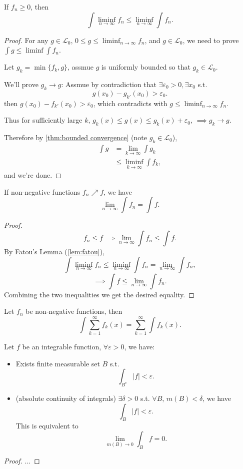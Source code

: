 \begin{lemma}
	\label{lem:fatou}
	If $f_n\ge 0$, then
	\[
		\int \liminf_{n\to \infty}f_n\le \liminf_{n\to \infty}\int f_n
	.\]
\end{lemma}
\begin{proof}[Proof]
	For any $g\in \mathcal{L}_0$,
	$0\le g\le \liminf_{n\to \infty} f_n$, and $g\in \mathcal{L}_0$,
	we need to prove $\int g\le \liminf \int f_n$. 

	Let $g_k=\min\{f_k, g\}$, assmue $g$ is uniformly bounded
	so that $g_k\in \mathcal{L}_0$.
	
    We'll prove $g_k\to g$:
	Assmue by contradiction that $\exists\varepsilon_0>0, \exists x_0$ s.t.
	\[
		g(x_0) - g_{k'}(x_0) > \varepsilon_0
	.\]
	then $g(x_0) - f_{k'}(x_0) > \varepsilon_0$,
	which contradicts with $g\le \liminf_{n\to \infty} f_n$.
	
	Thus for sufficiently large $k$,
	$g_k(x)\le g(x)\le g_k(x) + \varepsilon_0$, $\implies g_k\to g$.
	
	Therefore by \autoref{thm:bounded convergence} (note $g_k\in \mathcal{L}_0$),
	\begin{align*}
		\int g &= \lim_{k \to \infty}\int g_k \\
		&\le \liminf_{k \to \infty} \int f_k,
	\end{align*}
	and we're done.
\end{proof}

\begin{theorem}
	\label{thm:beppo-levi}
    If non-negative functions $f_n \nearrow f$, we have
	 \[
	\lim_{n\to \infty}\int f_n = \int f
	.\]
\end{theorem}
\begin{proof}[Proof]
    \[
    f_n\le f\implies \lim_{n \to \infty}\int f_n \le \int f
    .\]
    By Fatou's Lemma (\ref{lem:fatou}),
	\[
	\int \liminf_{n\to \infty} f_n \le \liminf_{n\to \infty}\int f_n
	= \lim_{n \to \infty}\int f_n,
	\]
	\[
		\implies \int f \le \lim_{n\to \infty} \int f_n.
	\]
	Combining the two inequalities we get the desired equality.
\end{proof}
\begin{corollary}
    Let $f_n$ be non-negative functions, then
	\[
	\int \sum_{k=1}^{\infty} f_k(x) = \sum_{k=1}^{\infty} \int f_k(x)
	.\]
\end{corollary}

\begin{proposition}
    Let $f$ be an integrable function, $\forall\varepsilon>0$, we have:
	 \begin{itemize}
		\item Exists finite measurable set $B$ s.t.
			\[
				\int_{B^c}|f|<\varepsilon
			.\]
	    \item (absolute continuity of integrals) $\exists\delta>0$ s.t.
			$\forall B$, $m(B)<\delta$, we have
			 \[
			 \int_B |f| < \varepsilon
			.\]
			This is equivalent to
			\[
				\lim_{m(B)\to 0}\int_B f = 0
			.\]
	\end{itemize}
\end{proposition}
\begin{proof}[Proof]
    ...
\end{proof}
